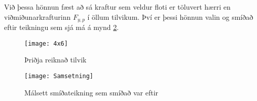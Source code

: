 Við þessa hönnun fæst að sá kraftur sem veldur floti er töluvert hærri en viðmiðunarkrafturinn $F_{y,p}$ í öllum tilvikum. 
Því er þessi hönnun valin og smíðað eftir teikningu sem sjá má á mynd \ref{fig::smidamynd}.


\begin{figure}
  \centering
  \texttt{[image: 4x6]}
  \caption{Þriðja reiknað tilvik}
  \label{fig::4x6}
\end{figure}

\begin{figure}
	\centering
	\texttt{[image: Samsetning]}
	\caption{Málsett smíðateikning sem smíðað var eftir}
	\label{fig::smidamynd}
\end{figure}